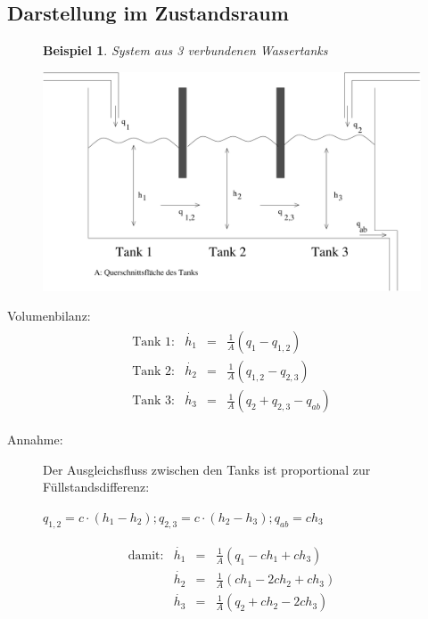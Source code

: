 \documentclass[12pt,a4paper,ngerman]{scrartcl}
\newtheorem{bsp}{Beispiel}[section] %
\begin{document}
\subsection{Darstellung im Zustandsraum}

\begin{figure}[H]
\begin{bsp}
System aus 3 verbundenen Wassertanks
\end{bsp}
  \centering
  \includegraphics[width=.9\linewidth]{sysregel_bsp_2,2}
\end{figure}
Volumenbilanz:
\begin{align*}
  \begin{array}{llll}
    \text{Tank 1:}&\dot{h_1}&=&\frac{1}{A}(q_1-q_{1,2})\\
    \text{Tank 2:}&\dot{h_2}&=&\frac{1}{A}(q_{1,2}-q_{2,3})\\
    \text{Tank 3:}&\dot{h_3}&=&\frac{1}{A}(q_{2}+q_{2,3}-q_{ab})
  \end{array}
\end{align*}
\begin{description}
\item[Annahme:]Der Ausgleichsfluss zwischen den Tanks ist proportional zur Füllstandsdifferenz: \begin{center}  $q_{1,2}=c\cdot (h_1-h_2);q_{2,3}=c\cdot (h_2-h_3);q_{ab}=ch_3$ \end{center}
\end{description}
\begin{align*}
  \begin{array}{llll}
    \text{damit:}&\dot{h_1}&=&\frac{1}{A}(q_1-ch_1+ch_3)\\
                 &\dot{h_2}&=&\frac{1}{A}(ch_1-2ch_2+ch_3)\\
                 &\dot{h_3}&=&\frac{1}{A}(q_2+ch_2-2ch_3)
  \end{array}
\end{align*}
\end{document}
